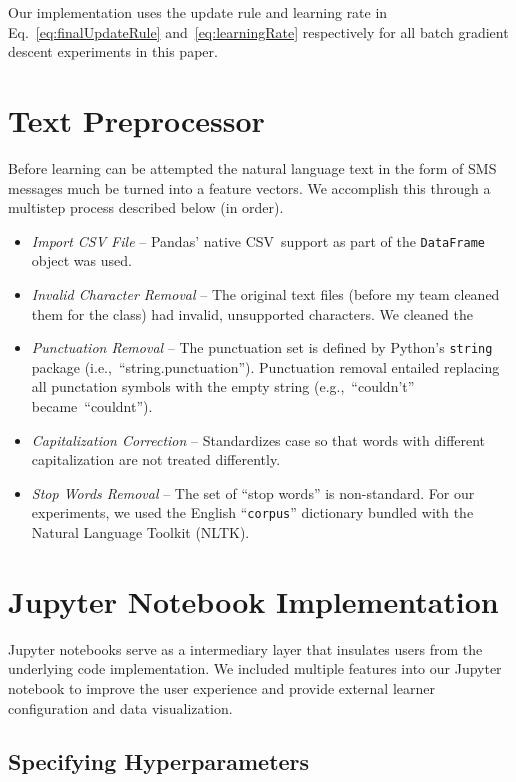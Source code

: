 \documentclass{report}
\begin{document}
  \noindent
  Our implementation uses the update rule and learning rate in Eq.~\eqref{eq:finalUpdateRule} and~\eqref{eq:learningRate} respectively for all batch gradient descent experiments in this paper.
    
  \section{Text Preprocessor}
  
  Before learning can be attempted the natural language text in the form of SMS messages much be turned into a feature vectors.  We accomplish this through a multistep process described below (in order).

  \begin{itemize}
    \item \textit{Import CSV File} -- Pandas' native CSV~support as part of the \texttt{DataFrame} object was used.
    \item \textit{Invalid Character Removal} -- The original text files (before my team cleaned them for the class) had invalid, unsupported characters.  We cleaned the 
    \item \textit{Punctuation Removal} -- The punctuation set is defined by Python's \texttt{string} package (i.e.,~``string.punctuation'').  Punctuation removal entailed replacing all punctation symbols with the empty string (e.g.,~``couldn't'' became~``couldnt'').
    \item \textit{Capitalization Correction} -- Standardizes case so that words with different capitalization are not treated differently.
    \item \textit{Stop Words Removal} -- The set of ``stop words'' is non-standard.  For our experiments, we used the English ``\texttt{corpus}'' dictionary bundled with the Natural Language Toolkit (NLTK).
  \end{itemize}

  \section{Jupyter Notebook Implementation}
  
  Jupyter notebooks serve as a intermediary layer that insulates users from the underlying code implementation.  We included multiple features into our Jupyter notebook to improve the user experience and provide external learner configuration and data visualization.
  
  \subsection{Specifying Hyperparameters}
  
\end{document}
